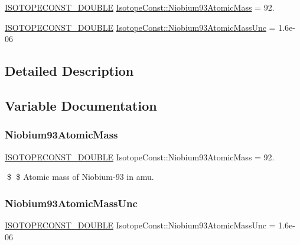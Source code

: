 \begin{DoxyCompactItemize}
\item 
\mbox{\hyperlink{group___isotope_const-_macros_ga8f45a7272ce02c0b4c65c44636ed719a}{I\+S\+O\+T\+O\+P\+E\+C\+O\+N\+S\+T\+\_\+\+D\+O\+U\+B\+LE}} \mbox{\hyperlink{group___isotope_const-_niobium-_nb93_ga76e6afcb73531b34efc14970765e764a}{Isotope\+Const\+::\+Niobium93\+Atomic\+Mass}} = 92.
\item 
\mbox{\hyperlink{group___isotope_const-_macros_ga8f45a7272ce02c0b4c65c44636ed719a}{I\+S\+O\+T\+O\+P\+E\+C\+O\+N\+S\+T\+\_\+\+D\+O\+U\+B\+LE}} \mbox{\hyperlink{group___isotope_const-_niobium-_nb93_ga1b57e76ee3b22ae2120db66231380b90}{Isotope\+Const\+::\+Niobium93\+Atomic\+Mass\+Unc}} = 1.\+6e-\/06
\end{DoxyCompactItemize}


\subsection{Detailed Description}


\subsection{Variable Documentation}
\mbox{\label{group___isotope_const-_niobium-_nb93_ga76e6afcb73531b34efc14970765e764a}} 
\subsubsection{\texorpdfstring{Niobium93\+Atomic\+Mass}{Niobium93AtomicMass}}
{\footnotesize\ttfamily \mbox{\hyperlink{group___isotope_const-_macros_ga8f45a7272ce02c0b4c65c44636ed719a}{I\+S\+O\+T\+O\+P\+E\+C\+O\+N\+S\+T\+\_\+\+D\+O\+U\+B\+LE}} Isotope\+Const\+::\+Niobium93\+Atomic\+Mass = 92.}

\$ \$ Atomic mass of Niobium-\/93 in amu. \mbox{\label{group___isotope_const-_niobium-_nb93_ga1b57e76ee3b22ae2120db66231380b90}} 
\subsubsection{\texorpdfstring{Niobium93\+Atomic\+Mass\+Unc}{Niobium93AtomicMassUnc}}
{\footnotesize\ttfamily \mbox{\hyperlink{group___isotope_const-_macros_ga8f45a7272ce02c0b4c65c44636ed719a}{I\+S\+O\+T\+O\+P\+E\+C\+O\+N\+S\+T\+\_\+\+D\+O\+U\+B\+LE}} Isotope\+Const\+::\+Niobium93\+Atomic\+Mass\+Unc = 1.\+6e-\/06}

